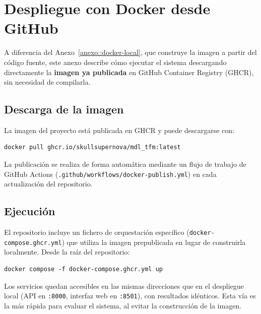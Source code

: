 %
\chapter{Despliegue con Docker desde GitHub}
\label{anexo::docker-ghcr}


A diferencia del Anexo~\ref{anexo::docker-local}, que construye la imagen a partir del
código fuente, este anexo describe cómo ejecutar el sistema descargando directamente la
\textbf{imagen ya publicada} en GitHub Container Registry (GHCR), sin necesidad de
compilarla.

\section{Descarga de la imagen}
\label{anexo::ghcr_pull}

La imagen del proyecto está publicada en GHCR y puede descargarse con:

\begin{verbatim}
docker pull ghcr.io/skullsupernova/mdl_tfm:latest
\end{verbatim}

La publicación se realiza de forma automática mediante un flujo de trabajo de GitHub
Actions (\texttt{.github/workflows/docker-publish.yml}) en cada actualización del
repositorio.

\section{Ejecución}
\label{anexo::ghcr_run}

El repositorio incluye un fichero de orquestación específico
(\texttt{docker-compose.ghcr.yml}) que utiliza la imagen prepublicada en lugar de
construirla localmente. Desde la raíz del repositorio:

\begin{verbatim}
docker compose -f docker-compose.ghcr.yml up
\end{verbatim}

Los servicios quedan accesibles en las mismas direcciones que en el despliegue local
(API en \texttt{:8000}, interfaz web en \texttt{:8501}), con resultados idénticos. Esta
vía es la más rápida para evaluar el sistema, al evitar la construcción de la imagen.
